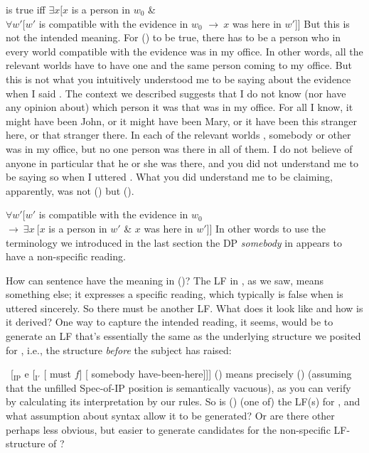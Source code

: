 \ex {} is true iff $\exists x [x$ is a person in $w_{0}$ \& \\
$\forall w'[w'$ is compatible with the evidence in $w_{0}$ $\rightarrow\ x$ was
here in $w'$]] \xe
%
But this is not the intended meaning. For (\lastx) to be true, there has to be a
person who in every world compatible with the evidence was in my office. In
other words, all the relevant worlds have to have one and the same person coming
to my office. But this is not what you intuitively understood me to be saying
about the evidence when I said . The context we described suggests
that I do not know (nor have any opinion about) which person it was that was in
my office. For all I know, it might have been John, or it might have been Mary,
or it have been this stranger here, or that stranger there. In each of the
relevant worlds , somebody or other was in my office, but no one person was
there in all of them. I do not believe of anyone in particular that he or she
was there, and you did not understand me to be saying so when I uttered
. What you did understand me to be claiming, apparently, was not
(\lastx) but (\nextx).

\ex \label{dedic} $\forall w' [ w'$ is compatible with the evidence in $w_{0}$\\
\hfill$\rightarrow\ \exists x\ [x$ is a person in $w'$ \& $x$ was here in
$w']]$ \xe
%
In other words \dash to use the terminology we introduced in the last section
\dash the DP \emph{somebody} in  appears to have a non-specific
reading.

How can sentence  have the meaning in (\lastx)? The LF in
, as we saw, means something else; it expresses a specific reading,
which typically is false when  is uttered sincerely. So there must be
another LF. What does it look like and how is it derived? One way to capture the
intended reading, it seems, would be to generate an LF that's essentially the
same as the underlying structure we posited for , i.e., the structure
\emph{before} the subject has raised:

\ex\ [$_{\text{IP}}$ e [$_{\text{I}'}$ [ must $f$] [ somebody have-been-here]]] \xe
%
(\lastx) means precisely (\blastx) (assuming that the unfilled Spec-of-IP
position is semantically vacuous), as you can verify by calculating its
interpretation by our rules. So is (\lastx) (one of) the LF(s) for ,
and what assumption about syntax allow it to be generated? Or are there other
\dash perhaps less obvious, but easier to generate \dash candidates for the
non-specific LF-structure of ?

